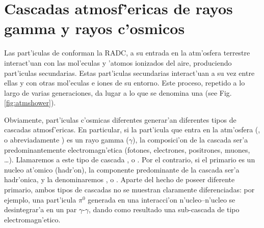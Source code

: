 

\chapter{Cascadas atmosf'ericas de rayos gamma y rayos c'osmicos}
\label{chapter:atmshowers}

Las part'iculas de conforman la RADC, a su entrada en la atm'osfera
terrestre interact'uan con las mol'eculas y 'atomos ionizados del
aire, produciendo part'iculas secundarias.  Estas part'iculas
secundarias interact'uan a su vez entre ellas y con otras mol'eculas e
iones de su entorno.  Este proceso, repetido a lo largo de varias
generaciones, da lugar a lo que se denomina una \emph{} (see Fig. \ref{fig:atmshower}).

Obviamente, part'iculas c'osmicas diferentes generar'an diferentes
tipos de cascadas atmosf'ericas. En particular, si la part'icula que
entra en la atm'osfera (\emph{}, o
abreviadamente \emph{}) es un rayo
gamma ($\gamma$), la composici'on de la cascada ser'a
predominantemente electromagn'etica (fotones, electrones, positrones,
muones, \ldots). Llamaremos a este tipo de cascada \emph{}, o \emph{}.  Por el contrario, si el
primario es un nucleo at'omico (hadr'on), la componente predominante
de la cascada ser'a hadr'onica, y la denominaremos \emph{}, o \emph{}. Aparte del hecho de poseer diferente
primario, ambos tipos de cascadas no se muestran claramente
diferenciadas: por ejemplo, una part'icula $\pi^{0}$ generada en una
interacci'on n'ucleo--n'ucleo se desintegrar'a en un par
$\gamma$-$\gamma$, dando como resultado una sub-cascada de tipo
electromagn'etico.

\atmshowerfig  %

\processesfig  %

